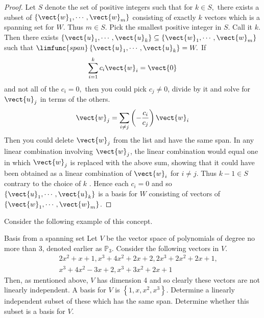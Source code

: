 \begin{proof}
Let $S$ denote the set of positive integers such that for $
k\in S,$ there exists a subset of $\left\{ \vect{w}_{1},\cdots ,\vect{w}
_{m}\right\} $ consisting of exactly $k$ vectors which is a spanning set for 
$W$. Thus $m\in S$. Pick the smallest positive integer in $S$. Call it $k$.
Then there exists $\left\{ \vect{u}_{1},\cdots ,\vect{u}_{k}\right\} \subseteq
\left\{ \vect{w}_{1},\cdots ,\vect{w}_{m}\right\} $ such that $\limfunc{span}
\left\{ \vect{u}_{1},\cdots ,\vect{u}_{k}\right\} =W.$ If 
\begin{equation*}
\sum_{i=1}^{k}c_{i}\vect{w}_{i}=\vect{0}
\end{equation*}
and not all of the $c_{i}=0,$ then you could pick $c_{j}\neq 0$, divide by
it and solve for $\vect{u}_{j}$ in terms of the others. 
\begin{equation*}
\vect{w}_{j}=\sum_{i\neq j}\left( -\frac{c_{i}}{c_{j}}\right) \vect{w}_{i}
\end{equation*}
Then you could delete $\vect{w}_{j}$ from the list and have the same span.
In any linear combination involving $\vect{w}_{j}$, the linear
combination would equal one in which $\vect{w}_{j}$ is replaced with the
above sum, showing that it could have been obtained as a linear combination
of $\vect{w}_{i}$ for $i\neq j$. Thus $k-1\in S$ contrary to the choice of $k$
. Hence each $c_{i}=0$ and so $\left\{ \vect{u}_{1},\cdots ,\vect{u}
_{k}\right\} $ is a basis for $W$ consisting of vectors of $\left\{ \vect{w}
_{1},\cdots ,\vect{w}_{m}\right\} $. 
\end{proof}

Consider the following example of this concept. 

\begin{example}{Basis from a spanning set}{}
Let $V$ be the vector space of polynomials of degree no more than 3,
denoted earlier as $\mathbb{P}_{3}$. Consider the following vectors in $V$.
\begin{eqnarray*}
&&2x^{2}+x+1,x^{3}+4x^{2}+2x+2,2x^{3}+2x^{2}+2x+1, \\
&&x^{3}+4x^{2}-3x+2,x^{3}+3x^{2}+2x+1
\end{eqnarray*}
Then, as mentioned above, $V$ has dimension 4 and so clearly these vectors
are not linearly independent. A basis for $V$ is $\left\{
1,x,x^{2},x^{3}\right\} $. Determine a linearly independent subset of these
which has the same span. Determine whether this subset is a basis for $V$.
\end{example}

